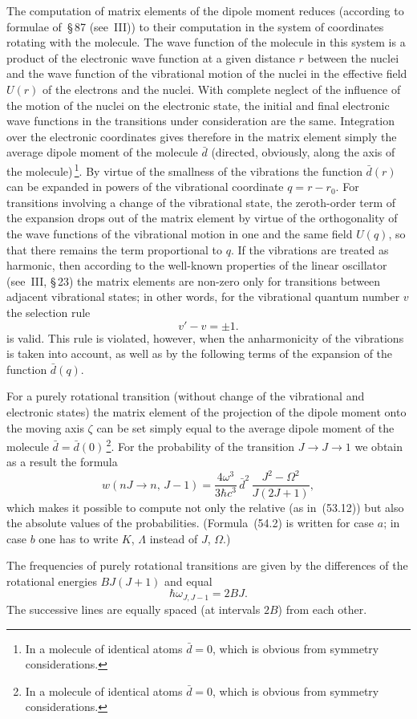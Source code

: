 The computation of matrix elements of the dipole moment reduces (according to formulae of~\S\,87 (see~III)) to their computation in the system of coordinates rotating with the molecule. The wave function of the molecule in this system is a product of the electronic wave function at a given distance $r$ between the nuclei and the wave function of the vibrational motion of the nuclei in the effective field $U(r)$ of the electrons and the nuclei. With complete neglect of the influence of the motion of the nuclei on the electronic state, the initial and final electronic wave functions in the transitions under consideration are the same. Integration over the electronic coordinates gives therefore in the matrix element simply the average dipole moment of the molecule $\bar{d}$ (directed, obviously, along the axis of the molecule)\,\footnote{In a molecule of identical atoms $\bar{d} = 0$, which is obvious from symmetry considerations.}. By virtue of the smallness of the vibrations the function $\bar{d}(r)$ can be expanded in powers of the vibrational coordinate $q = r - r_0$. For transitions involving a change of the vibrational state, the zeroth-order term of the expansion drops out of the matrix element by virtue of the orthogonality of the wave functions of the vibrational motion in one and the same field $U(q)$, so that there remains the term proportional to $q$. If the vibrations are treated as harmonic, then according to the well-known properties of the linear oscillator (see~III, \S\,23) the matrix elements are non-zero only for transitions between adjacent vibrational states; in other words, for the vibrational quantum number $v$ the selection rule
\begin{equation}
v' - v = \pm 1.
\tag{54.1}
\end{equation}
is valid. This rule is violated, however, when the anharmonicity of the vibrations is taken into account, as well as by the following terms of the expansion of the function $\bar{d}(q)$.

For a purely rotational transition (without change of the vibrational and electronic states) the matrix element of the projection of the dipole moment onto the moving axis $\zeta$ can be set simply equal to the average dipole moment of the molecule $\bar{d} = \bar{d}(0)$\,\footnote{In a molecule of identical atoms $\bar{d} = 0$, which is obvious from symmetry considerations.}. For the probability of the transition $J \to J \to 1$ we obtain as a result the formula
\begin{equation}
w(nJ \to n,\,J-1) = \frac{4\omega^3}{3\hbar c^3}\,\bar{d}^2\,\frac{J^2 - \Omega^2}{J(2J+1)},
\tag{54.2}
\end{equation}
which makes it possible to compute not only the relative (as in~(53.12)) but also the absolute values of the probabilities. (Formula~(54.2) is written for case $a$; in case $b$ one has to write $K$, $\Lambda$ instead of $J$, $\Omega$.)

The frequencies of purely rotational transitions are given by the differences of the rotational energies $BJ(J + 1)$ and equal
\begin{equation}
\hbar\omega_{J,J-1} = 2BJ.
\tag{54.3}
\end{equation}
The successive lines are equally spaced (at intervals $2B$) from each other.
